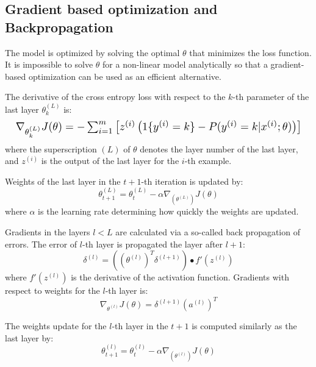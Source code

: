 \subsection{Gradient based optimization and Backpropagation}
\label{subsec:backprop}

The model is optimized by solving the optimal $\theta$ that minimizes the loss function.
It is impossible to solve $\theta$ for a non-linear model analytically so that a gradient-based optimization can be used as an efficient alternative.

The derivative of the cross entropy loss with respect to the $k$-th parameter of the last layer $\theta_k^{(L)}$ is:
\begin{equation*}
  \resizebox{\columnwidth}{!}{
  $ \nabla_{\theta^{(L)}_k} J(\theta) = - \sum_{i=1}^{m}{ \left[ z^{(i)} \left( 1\{ y^{(i)} = k\}  - P(y^{(i)} = k | x^{(i)}; \theta) \right) \right]  } $
  }
\end{equation*}
where the superscription $(L)$ of $\theta$ denotes the layer number of the last layer, and $z^{(i)}$ is the output of the last layer for the $i$-th example.

Weights of the last layer in the $t+1$-th iteration is updated by:
$$\theta_{t+1}^{(L)} = \theta_t^{(L)} - \alpha \nabla_{(\theta^{(L)})} J(\theta)$$
where $\alpha$ is the learning rate determining how quickly the weights are updated.

Gradients in the layers $l<L$ are calculated via a so-called back propagation of errors.
The error of $l$-th layer is propagated the layer after $l+1$:
$$\delta^{(l)} = \left((\theta^{(l)})^T \delta^{(l+1)}\right) \bullet f'(z^{(l)})$$
where $f'(z^{(l)})$ is the derivative of the activation function.
Gradients with respect to weights for the $l$-th layer is:
$$
\nabla_{\theta^{(l)}} J(\theta) = \delta^{(l+1)} (a^{(l)})^T
$$

The weights update for the $l$-th layer in the $t+1$ is computed similarly as the last layer by:
$$\theta_{t+1}^{(l)} = \theta_t^{(l)} - \alpha \nabla_{(\theta^{(l)})} J(\theta)$$
